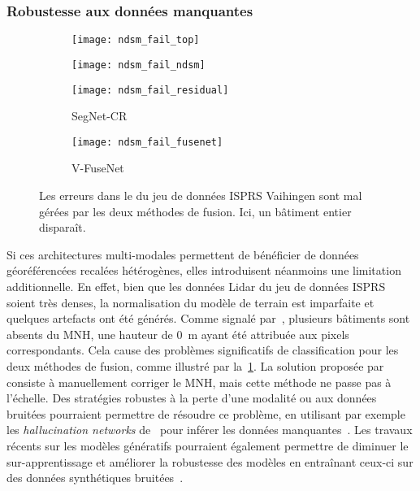 \subsubsection{Robustesse aux données manquantes}

\begin{figure}[h]
	\captionsetup[subfigure]{singlelinecheck=off,justification=centering}
    \captionsetup[subfigure]{labelformat=empty}
    \begin{subfigure}{0.24\textwidth}
    	\texttt{[image: ndsm\_fail\_top]}
        \caption{}
    \end{subfigure}
    \begin{subfigure}{0.24\textwidth}
    	\texttt{[image: ndsm\_fail\_ndsm]}
        \caption{}
    \end{subfigure}
    \begin{subfigure}{0.24\textwidth}
    	\texttt{[image: ndsm\_fail\_residual]}
        \caption{SegNet-CR}
    \end{subfigure}
    \begin{subfigure}{0.24\textwidth}
    	\texttt{[image: ndsm\_fail\_fusenet]}
        \caption{V-FuseNet}
    \end{subfigure}
	\caption{Les erreurs dans le  du jeu de données \gls{ISPRS} Vaihingen sont mal gérées par les deux méthodes de fusion. Ici, un bâtiment entier disparaît.}
    \label{fig:ndsm_fail}
\end{figure}

Si ces architectures multi-modales permettent de bénéficier de données géoréférencées recalées hétérogènes, elles introduisent néanmoins une limitation additionnelle. En effet, bien que les données \gls{Lidar} du jeu de données \gls{ISPRS} soient très denses, la normalisation du modèle de terrain est imparfaite et quelques artefacts ont été générés. Comme signalé par~\citet{marmanis_classification_2017}, plusieurs bâtiments sont absents du \gls{MNH}, une hauteur de \SI{0}{\meter} ayant été attribuée aux pixels correspondants. Cela cause des problèmes significatifs de classification pour les deux méthodes de fusion, comme illustré par la~\cref{fig:ndsm_fail}. La solution proposée par~\cite{marmanis_classification_2017} consiste à manuellement corriger le \gls{MNH}, mais cette méthode ne passe pas à l'échelle. Des stratégies robustes à la perte d'une modalité ou aux données bruitées pourraient permettre de résoudre ce problème, en utilisant par exemple les \emph{hallucination networks} de~\citet{hoffman_learning_2016} pour inférer les données manquantes~\cite{kampffmeyer_semantic_2016}. Les travaux récents sur les modèles génératifs pourraient également permettre de diminuer le sur-apprentissage et améliorer la robustesse des modèles en entraînant ceux-ci sur des données synthétiques bruitées~\cite{xie_adversarial_2017}.

